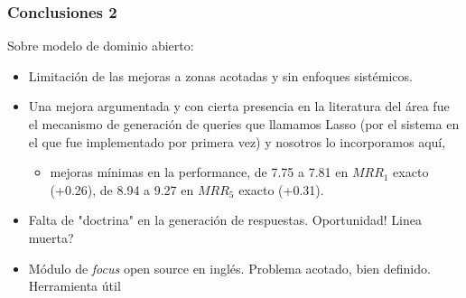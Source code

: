 \begin{frame}
\frametitle{Conclusiones 2}

Sobre modelo de dominio abierto:
  \begin{itemize}
 \item Limitación de las mejoras a zonas acotadas y sin enfoques sistémicos. 
 \item Una mejora argumentada y con cierta presencia en la literatura del área fue el mecanismo de generación de queries que llamamos Lasso (por el sistema en el que fue implementado por primera vez) y nosotros lo incorporamos aquí, 
\begin{itemize}
    \item  mejoras mínimas en la performance, de 7.75 a 7.81 en $MRR_1$ exacto (+0.26), de 8.94 a 9.27 en $MRR_5$ exacto (+0.31). 
  \end{itemize}
  \item Falta de "doctrina" en la generación de respuestas. Oportunidad! Linea muerta? 
\item Módulo de \textit{focus} open source en inglés. Problema acotado, bien definido. Herramienta útil
  \end{itemize}
\end{frame}
